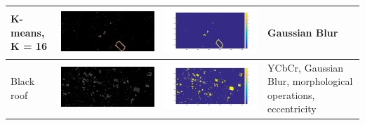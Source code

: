 \documentclass[fleqn,10pt]{SelfArx} %
\begin{document}
\begin{table}
\begin{tabular}{>{\centering\arraybackslash}M{8mm}cc>{\centering\arraybackslash}M{20mm}}
\midrule 
\vspace{-3cm}
\hspace{-0.6cm}
K-means, K = 16 & \includegraphics[clip,scale=0.07]{16rgb.jpg} & \includegraphics[trim={6cm 2.5cm 4.5cm 1.6cm},clip,scale=0.18]{16.jpg} & \vspace{-3cm}Gaussian Blur \\ 
\midrule 
\vspace{-3cm}
\hspace{-0.3cm}
Black roof & \includegraphics[clip,scale=0.07]{17rgb.jpg} & \includegraphics[trim={6cm 2.5cm 4.5cm 1.6cm},clip,scale=0.18]{17.jpg} & \vspace{-3cm} YCbCr, Gaussian Blur, morphological operations, eccentricity \\ 

\end{tabular}
\end{table}
\end{document}
